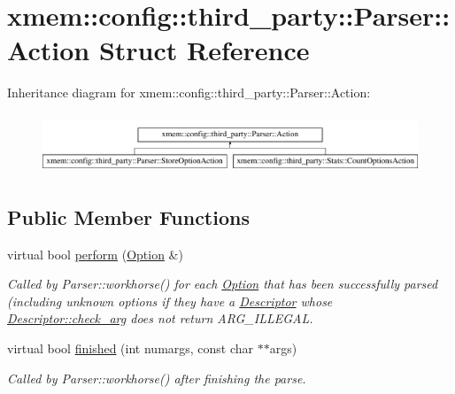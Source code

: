 \hypertarget{structxmem_1_1config_1_1third__party_1_1_parser_1_1_action}{\section{xmem\-:\-:config\-:\-:third\-\_\-party\-:\-:Parser\-:\-:Action Struct Reference}
\label{structxmem_1_1config_1_1third__party_1_1_parser_1_1_action}
}
Inheritance diagram for xmem\-:\-:config\-:\-:third\-\_\-party\-:\-:Parser\-:\-:Action\-:\begin{figure}[H]
\begin{center}
\leavevmode
\includegraphics[height=1.794872cm]{structxmem_1_1config_1_1third__party_1_1_parser_1_1_action}
\end{center}
\end{figure}
\subsection*{Public Member Functions}
\begin{DoxyCompactItemize}
\item 
virtual bool \hyperlink{structxmem_1_1config_1_1third__party_1_1_parser_1_1_action_aeffc43365955b3dc5f54552093518aa5}{perform} (\hyperlink{classxmem_1_1config_1_1third__party_1_1_option}{Option} \&)
\begin{DoxyCompactList}\small\item\em Called by Parser\-::workhorse() for each \hyperlink{classxmem_1_1config_1_1third__party_1_1_option}{Option} that has been successfully parsed (including unknown options if they have a \hyperlink{structxmem_1_1config_1_1third__party_1_1_descriptor}{Descriptor} whose \hyperlink{structxmem_1_1config_1_1third__party_1_1_descriptor_a65b39f8d61de820bb5001d590e7dea5d}{Descriptor\-::check\-\_\-arg} does not return A\-R\-G\-\_\-\-I\-L\-L\-E\-G\-A\-L. \end{DoxyCompactList}\item 
virtual bool \hyperlink{structxmem_1_1config_1_1third__party_1_1_parser_1_1_action_a8f392f5dd42f483fa45ae5d83c9389ac}{finished} (int numargs, const char $\ast$$\ast$args)
\begin{DoxyCompactList}\small\item\em Called by Parser\-::workhorse() after finishing the parse. \end{DoxyCompactList}\end{DoxyCompactItemize}


